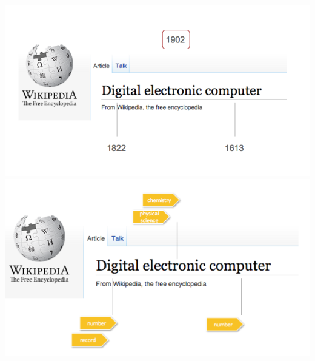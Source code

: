 \documentclass[a4paper, 12pt]{article}
\begin{document}
\includegraphics[width=\textwidth]{title_dates}  
\includegraphics[width=\textwidth]{title_tags}  
\end{document}
